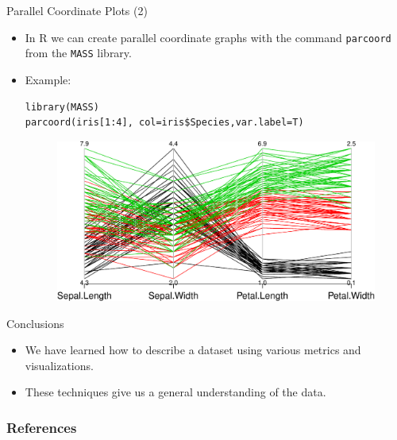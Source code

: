 \documentclass[handout]{beamer}
\begin{document}
\begin{frame}[fragile]{Parallel Coordinate Plots (2)}
\scriptsize{
 \begin{itemize}
  \item  In R we can create parallel coordinate graphs with the command \verb+parcoord+ from the \verb+MASS+ library.
  \item Example:
  \begin{verbatim}
library(MASS)
parcoord(iris[1:4], col=iris$Species,var.label=T)   
  \end{verbatim}
  
  \begin{figure}[h!]
	\centering
	\includegraphics[scale=0.5]{pics/parallel.pdf}		
\end{figure}   

 \end{itemize} 
 
 }  
\end{frame}

\begin{frame}[fragile]{Conclusions}
\scriptsize{
 \begin{itemize}
  \item We have learned how to describe a dataset using various metrics and visualizations.
  \item These techniques give us a general understanding of the data.  
 \end{itemize} 
 
 }  
\end{frame}




\begin{frame}[allowframebreaks]\scriptsize
\frametitle{References}


%
\end{frame}  












\end{document}
